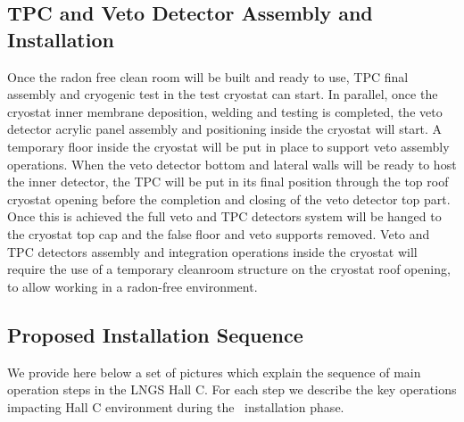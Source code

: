 \subsection{TPC and Veto Detector Assembly and Installation}
\label{sec:TPCAndVetoAssembly}

Once the radon free clean room will be built and ready to use, TPC final assembly and
cryogenic test in the test cryostat can start. In parallel, once the cryostat inner membrane
deposition, welding and testing is completed, the veto detector acrylic panel assembly and
positioning inside the cryostat will start. A temporary floor inside the cryostat will be put in
place to support veto assembly operations. When the veto detector bottom and lateral walls
will be ready to host the inner detector, the TPC will be put in its final position through the
top roof cryostat opening before the completion and closing of the veto detector top part.
Once this is achieved the full veto and TPC detectors system will be hanged to the cryostat
top cap and the false floor and veto supports removed. Veto and TPC detectors assembly and
integration operations inside the cryostat will require the use of a temporary cleanroom
structure on the cryostat roof opening, to allow working in a radon-free environment.

\subsection{\DSks Proposed Installation Sequence}
\label{sec:InstallationSequence}

We provide here below a set of pictures which explain the sequence of main operation steps in
the LNGS Hall C. For each step we describe the key operations impacting Hall C
environment during the \DSks\ installation phase.

